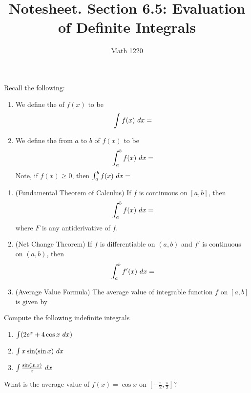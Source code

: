 \documentclass[12pt, a4paper]{article}
\author{Math 1220}
\title{Notesheet. Section 6.5: Evaluation of Definite Integrals}
\date{}
\begin{document}
\maketitle
\nameline
Recall the following:
\begin{defi}
  \begin{enumerate}
  \item We define the  of \(f(x)\) to be \[
      \int f(x) \ d x = 
    \]
  \item We define the  from \(a\) to \(b\) of
    \(f(x)\) to be \[
      \int_a^b f(x) \ d x =
    \]
    Note, if \(f(x) \geq 0\), then \(\int_a^b f(x) \ d x = \)
  \end{enumerate}
\end{defi}
\begin{thrm}
  \begin{enumerate}
  \item (Fundamental Theorem of Calculus)   If \(f\) is continuous on
    \([a,b]\), then \[
    \int_a^b f(x) \ d x = 
  \]
  where \(F\) is any antiderivative of \(f\). 
  \item (Net Change Theorem) If \(f\) is differentiable on \((a,b)\)
    and \(f'\) is continuous on \((a,b)\), then \[
      \int_a^b f'(x) \ d x = 
    \]
  \item (Average Value Formula) The average value of integrable
    function \(f\) on \([a,b]\) is given by 
  \end{enumerate}
\end{thrm}
\begin{ex}
  Compute the following indefinite integrals
  \begin{enumerate}
  \item \(\int (2e^x+4\cos x \ d x)\)
    \vspace{0.5in}
  \item \(\int x \sin(\sin x) \ d x\)
        \vspace{0.5in}
  \item \(\int \frac{\sin(\ln x)}{x} \ d x\)
  \end{enumerate}
\end{ex}
\vspace{-1in}
\begin{ex}
  What is the average value of \(f(x) = \cos x\) on \(\left[-\frac{\pi}{2}, \frac{\pi}{2}\right]\)?
\end{ex}
\end{document}
